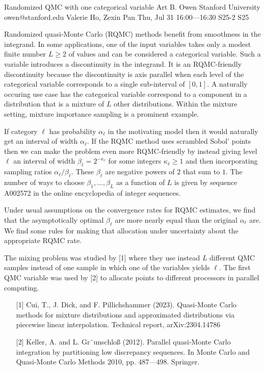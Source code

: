 \begin{talk}
  {Randomized QMC with one categorical variable}%
  {Art B. Owen}%
  {Stanford University}%
  {owen@stanford.edu}%
  {Valerie Ho, Zexin Pan}%
  {}%
  {Thu, Jul 31 16:00---16:30}%
  {S25-2}%
  {S25}%
  
    
   
  Randomized quasi-Monte Carlo (RQMC) methods benefit from smoothness
  in the integrand.  In some applications, one of the input variables takes
  only a modest finite number $L\geqslant2$
of values and can be considered a categorical
  variable. Such a variable introduces a discontinuity in the integrand.  It is
  an RQMC-friendly discontinuity because the discontinuity is axis parallel
  when each level of the categorical variable corresponds to a single
  sub-interval of $[0,1]$.  A naturally occuring use case has
  the categorical variable correspond to a component in a distribution
  that is a mixture of $L$ other distributions.  Within the mixture
  setting, mixture importance sampling is a prominent example.

 If category $\ell$  has probability $\alpha_\ell$ in the motivating
  model then it would naturally get an interval of width $\alpha_\ell$.
If the RQMC method uses scrambled Sobol' points
then we can make the problem even more RQMC-friendly by instead giving
  level $\ell$ an interval of width $\beta_\ell = 2^{-\kappa_\ell}$
  for some integers $\kappa_\ell \geqslant1$ and then
  incorporating sampling ratios $\alpha_\ell/\beta_\ell$.
  These $\beta_\ell$ are negative powers of $2$ that sum to $1$.
  The number of ways to choose $\beta_1,\dots,\beta_L$
  as a function of $L$ is given by sequence A002572 in the
  online encyclopedia of integer sequences.

  Under usual assumptions on the convergence rates for RQMC
  estimates, we find that the asymptotically optimal $\beta_\ell$
  are more nearly equal than the original $\alpha_\ell$ are.
  We find some rules for making that  allocation under uncertainty
  about the appropriate RQMC rate.

  The mixing problem was studied by [1] where they use instead
  $L$ different QMC samples instead of one sample in which
  one of the variables yields $\ell$. The first QMC variable
  was used by [2] to allocate points to different processors
  in parallel computing.

\medskip
\begin{enumerate}
 \item[{[1]}] Cui, T., J. Dick, and F. Pillichshammer (2023). Quasi-Monte Carlo methods
for mixture distributions and approximated distributions via piecewise linear
interpolation. Technical report, arXiv:2304.14786 
\item[{[2]}]
Keller, A. and L. Gr¨unschlo{\ss} (2012). Parallel quasi-Monte Carlo integration by
partitioning low discrepancy sequences. In Monte Carlo and Quasi-Monte
Carlo Methods 2010, pp. 487---498. Springer.
\end{enumerate}

\end{talk}

